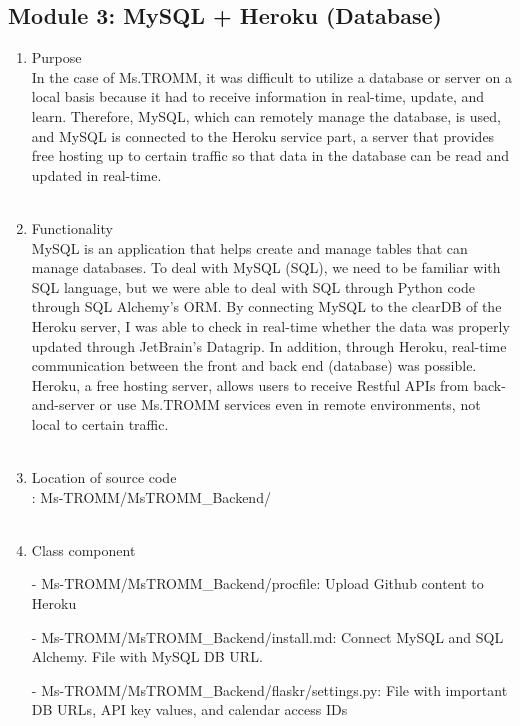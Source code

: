 \documentclass[conference]{IEEEtran}
\begin{document}
\subsection{Module 3: MySQL + Heroku (Database)}
\begin{enumerate}
    \item Purpose \\
    In the case of Ms.TROMM, it was difficult to utilize a database or server on a local basis because it had to receive information in real-time, update, and learn. Therefore, MySQL, which can remotely manage the database, is used, and MySQL is connected to the Heroku service part, a server that provides free hosting up to certain traffic so that data in the database can be read and updated in real-time. \\ \\
    \item Functionality \\
    MySQL is an application that helps create and manage tables that can manage databases. To deal with MySQL (SQL), we need to be familiar with SQL language, but we were able to deal with SQL through Python code through SQL Alchemy's ORM. By connecting MySQL to the clearDB of the Heroku server, I was able to check in real-time whether the data was properly updated through JetBrain's Datagrip. In addition, through Heroku, real-time communication between the front and back end (database) was possible. Heroku, a free hosting server, allows users to receive Restful APIs from back-and-server or use Ms.TROMM services even in remote environments, not local to certain traffic.\\ \\
    \item Location of source code\\: Ms-TROMM/MsTROMM\_Backend/ \\ \\
    \item Class component 
        \item[-] Ms-TROMM/MsTROMM\_Backend/procfile: Upload Github content to Heroku \\
        \item[-] Ms-TROMM/MsTROMM\_Backend/install.md: Connect MySQL and SQL Alchemy. File with MySQL DB URL. \\
        \item[-] Ms-TROMM/MsTROMM\_Backend/flaskr/settings.py: File with important DB URLs, API key values, and calendar access IDs \\ \\

\end{enumerate}
\end{document}
